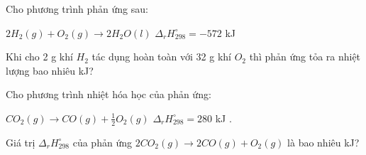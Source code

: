 \documentclass[Main.tex]{subfiles}
\begin{document}
	\begin{bt}
		 Cho phương trình phản ứng sau:
		
		$2H_2(g) + O_2(g) \longrightarrow 2H_2O(l)$ $\Delta_r H_{298}^\circ = -572$ kJ
		
		Khi cho 2 g khí $H_2$ tác dụng hoàn toàn với 32 g khí $O_2$ thì phản ứng tỏa ra nhiệt lượng bao nhiêu kJ?
	\end{bt}
	\begin{bt}
		Cho phương trình nhiệt hóa học của phản ứng:
		
		$CO_2(g) \longrightarrow CO(g) + \frac{1}{2} O_2(g)$ $\Delta_r H_{298}^\circ = 280$ kJ .
		
		Giá trị $\Delta_r H_{298}^\circ$ của phản ứng $2CO_2(g) \longrightarrow 2CO(g) + O_2(g)$ là bao nhiêu kJ?
	\end{bt}
	
\end{document}
